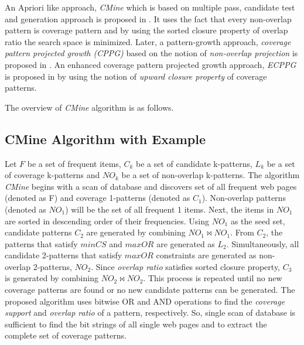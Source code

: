 An Apriori like approach, \emph{CMine} which is based on multiple pass, candidate test and generation approach is proposed in \cite{srinivas2012discovering}. It uses the fact that every non-overlap pattern is coverage pattern and by using the sorted closure property of overlap ratio the search space is minimized. Later, a pattern-growth approach, \emph{coverage pattern projected growth (CPPG)} based on the notion of \emph{non-overlap projection} is proposed in \cite{srinivas2013cppg}. An enhanced coverage pattern projected growth approach, \emph{ECPPG} is proposed in \cite{srinivas2014mining} by using the notion of \emph{upward closure property} of coverage patterns.

The overview of \emph{CMine} algorithm is as follows. 

\subsection{ CMine Algorithm with Example}
\label{subsec:cmine}
 Let $F$ be a set of frequent items, $C_k$ be a set of candidate k-patterns, $L_k$ be a set of coverage k-patterns and $NO_k$ be a set of non-overlap k-patterns.  The algorithm \emph{CMine} begins with a scan of database and discovers set of all frequent web pages (denoted as F) and coverage 1-patterns (denoted as $C_1$). Non-overlap patterns (denoted as $NO_1$) will be the set of all frequent 1 items. Next, the items in $NO_1$ are sorted in descending order of their frequencies. Using $NO_1$ as the seed set, candidate patterns $C_2$ are generated by combining $NO_1 \Join NO_1$. From $C_2$, the patterns that satisfy $minCS$ and $maxOR$ are generated as  $L_2$. Simultaneously, all candidate 2-patterns that satisfy $maxOR$ constraints are generated as non-overlap 2-patterns, $NO_2$. Since \emph{overlap ratio} satisfies sorted closure property, $C_3$ is generated by combining $NO_2 \Join NO_2$. This process is repeated until no new coverage patterns are found or no new candidate patterns can be generated.
The proposed algorithm uses bitwise OR and AND operations to find the \emph{coverage support} and \emph{overlap ratio}  of a pattern, respectively.  So, single scan of database is sufficient to find the bit strings of all single web pages and to extract the complete set of coverage patterns.

